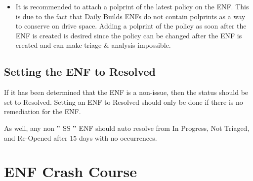 \documentclass[a4paper,12pt]{report}
\begin{document}
\begin{itemize}
\item It is recommended to attach a polprint of the latest policy on the ENF. This is due to the fact that Daily Builds ENFs do not contain polprints as a way to conserve on drive space. Adding a polprint of the policy as soon after the ENF is created is desired since the policy can be changed after the ENF is created and can make triage  $  \&  $  analysis impossible. \par
\end{itemize}
\subsection*{Setting the ENF to Resolved}
 \par
If it has been determined that the ENF is a non-issue, then the status should be set to Resolved. Setting an ENF to Resolved should only be done if there is no remediation for the ENF.  \par
As well, any non  $ " $ SS $ " $  ENF should auto resolve from In Progress, Not Triaged, and Re-Opened after 15 days with no occurrences. \par
\section*{ENF Crash Course}
 \par
\end{document}
